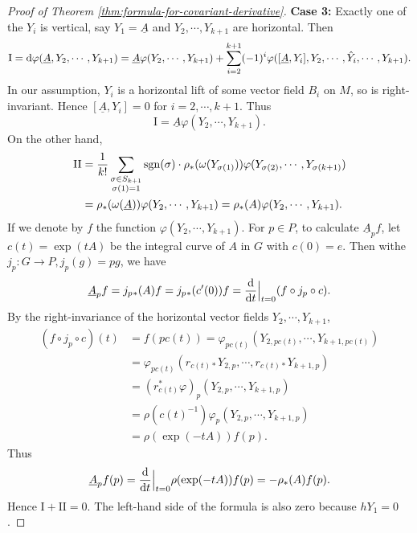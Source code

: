 \begin{proof}[Proof of Theorem \ref{thm:formula-for-covariant-derivative}]
    \noindent\textbf{Case 3:} Exactly one of the $Y_i$ is vertical, say $Y_1=\underline{A}$ and $Y_2, \cdots, Y_{k+1}$ are horizontal. 
    Then 
    \begin{equation*}
        \mathrm{I} = {\rm d}\varphi(\underline{A}, Y_2, \cdots, Y_{k+1}) 
        = \underline{A}\varphi(Y_2, \cdots, Y_{k+1}) + \sum_{i=2}^{k+1} (-1)^{i}\varphi([\underline{A}, Y_i], Y_2, \cdots, \hat{Y}_i, \cdots, Y_{k+1}).
    \end{equation*}
    In our assumption, $Y_i$ is a horizontal lift of some vector field $B_i$ on $M$, so is right-invariant. 
    Hence $[\underline{A}, Y_i] = 0$ for $i=2, \cdots, k+1$. Thus 
    \begin{equation*}
        \mathrm{I} = \underline{A}\varphi(Y_2, \cdots, Y_{k+1}).
    \end{equation*}
    On the other hand,
    \begin{align*}
        \mathrm{II} &= \frac{1}{k!}\sum_{\begin{subarray}{c}\sigma\in S_{k+1} \\ \sigma(1)=1\end{subarray}}
        \mathrm{sgn}(\sigma)\cdot \rho_*(\omega(Y_{\sigma(1)}))\varphi(Y_{\sigma(2)}, \cdots, Y_{\sigma(k+1)}) \\ 
        &= \rho_*(\omega(\underline{A}))\varphi(Y_2, \cdots, Y_{k+1})  
        = \rho_*(A)\varphi(Y_2, \cdots, Y_{k+1}).
    \end{align*}
    If we denote by $f$ the function $\varphi(Y_2, \cdots, Y_{k+1})$. For $p\in P$, to calculate $\underline{A}_pf$, 
    let $c(t) = \exp(tA)$ be the integral curve of $A$ in $G$ with $c(0)=e$. Then withe $j_p: G\to P, j_p(g) = pg$, we have
    \begin{align*}
        \underline{A}_pf = j_p{}_*(A)f = j_p{}_*(c'(0))f = \frac{{\rm d}}{{\rm d} t}\Big|_{t=0} (f\circ j_p\circ c).
    \end{align*}
    By the right-invariance of the horizontal vector fields $Y_2, \cdots, Y_{k+1}$, 
    \begin{align*}
        (f\circ j_p\circ c)(t) &= f(pc(t)) = \varphi_{pc(t)}(Y_{2,pc(t)}, \cdots, Y_{k+1, pc(t)}) \\ 
        &= \varphi_{pc(t)}(r_{c(t)*}Y_{2,p}, \cdots, r_{c(t)*}Y_{k+1, p}) \\
        &= (r_{c(t)}^*\varphi)_p(Y_{2,p}, \cdots, Y_{k+1, p}) \\
        &= \rho(c(t)^{-1})\varphi_p(Y_{2,p}, \cdots, Y_{k+1, p}) \\
        &= \rho(\exp(-tA))f(p).
    \end{align*}
    Thus 
    \begin{equation*}
        \underline{A}_pf(p) = \frac{{\rm d}}{{\rm d} t}\Big|_{t=0} \rho(\exp(-tA))f(p) = -\rho_*(A)f(p).
    \end{equation*}
    Hence $\mathrm{I} + \mathrm{II} = 0$. The left-hand side of the formula is also zero because $hY_1 = 0$. 
\end{proof}
